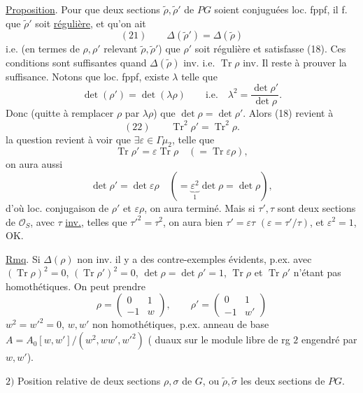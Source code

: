 \uline{Proposition}. Pour que deux sections
$\widetilde\rho,\widetilde\rho'$ de $PG$ soient
 conjuguées loc. fppf,
il f. 
que $\widetilde\rho'$ soit \uline{régulière}, et qu'on ait
\margin{$\Big|$}
\[
(21)\qquad
\Delta(\widetilde\rho')=\Delta(\widetilde\rho)
\]
i.e. (en termes de $\rho,\rho'$ relevant
$\widetilde\rho,\widetilde\rho'$) que $\rho'$ soit
régulière et satisfasse (18).
Ces conditions sont suffisantes quand
$\Delta(\widetilde\rho)$ inv. i.e. $\operatorname{Tr}\rho$ inv.
Il reste à prouver la suffisance. Notons que loc. fppf,
existe $\lambda$  telle que
\[
\det(\rho')=\det(\lambda\rho)\qquad
\text{i.e.}\quad\lambda^2=\frac{\det\rho'}{\det\rho}.
\]
Donc  (quitte à remplacer $\rho$ par $\lambda\rho$)
que $\det\rho=\det\rho'$.
Alors (18) revient à
\[
(22)\qquad
\operatorname{Tr}^2\rho'=\operatorname{Tr}^2\rho.
\]
 la question revient à voir que
$\exists\varepsilon\in\Gamma\mu_2$, telle que
\[
\operatorname{Tr}\rho'=\varepsilon\operatorname{Tr}\rho
\quad(=\operatorname{Tr}\varepsilon\rho),
\]
on aura aussi
\[
\det\rho'=\det\varepsilon\rho
\quad(=\underbrace{\varepsilon^2}_{1}\det\rho=\det\rho),
\]
d'où loc. conjugaison de $\rho'$ et $\varepsilon\rho$,
on aura terminé. Mais si $\tau',\tau$ sont deux sections de
$\mathcal O_S$, avec $\tau$ \uline{inv.}, telles que
$\tau'^2=\tau^2$, on aura bien
$\tau'=\varepsilon\tau$ $(\varepsilon=\tau'/\tau)$,
et $\varepsilon^2=1$, OK.



\uline{Rmq}. Si $\Delta(\rho)$ non inv. il y a des
contre-exemples évidents, p.ex. avec
$(\operatorname{Tr}\rho)^2=0$,
$(\operatorname{Tr}\rho')^2=0$,
$\det\rho=\det\rho'=1$,
$\operatorname{Tr}\rho$ et $\operatorname{Tr}\rho'$
n'étant pas homothétiques. On peut prendre
\[
\rho=\begin{pmatrix}0&1\\-1&w\end{pmatrix},
\qquad
\rho'=\begin{pmatrix}0&1\\-1&w'\end{pmatrix}
\]
$w^2=w'^2=0$, $w,w'$ non homothétiques, p.ex.
anneau de base
$A=A_0[w,w']/(w^2,ww',w'^2)$
( duaux sur le module libre de rg $2$
engendré par $w,w'$).

$2)$ Position relative de deux sections $\rho,\sigma$
de $G$, ou $\widetilde\rho,\widetilde\sigma$ les deux sections de $PG$.
\margin{$\big|$}

